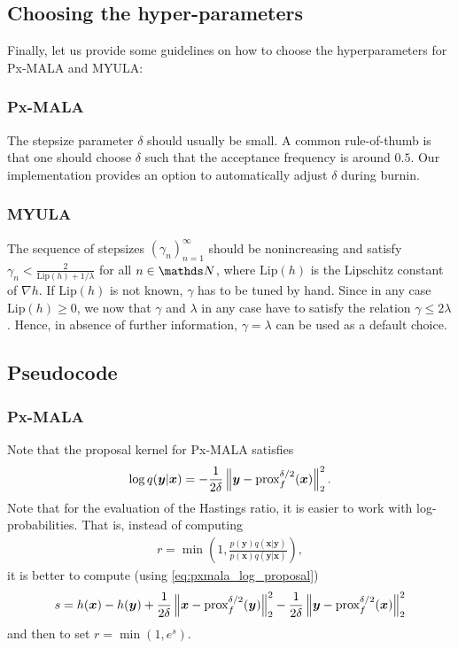 \documentclass[10pt]{article}
\numberwithin{equation}{section}
\begin{document}
\subsection{Choosing the hyper-parameters}

Finally, let us provide some guidelines on how to choose the hyperparameters for Px-MALA and MYULA:

\subsubsection*{Px-MALA}

The stepsize parameter $\delta$ should usually be small. A common rule-of-thumb is that one should choose $\delta$ such that the acceptance frequency is around $0.5$. Our implementation provides an option to automatically adjust $\delta$ during burnin.

\subsubsection*{MYULA}

The sequence of stepsizes $(\gamma_n)_{n=1}^\infty$ should be nonincreasing and satisfy $\gamma_n < \frac{2}{\mathrm{Lip}(h) + 1/\lambda}$ for all $n \in \N$, where $\mathrm{Lip}(h)$ is the Lipschitz constant of $\nabla h$. If $\mathrm{Lip}(h)$ is not known, $\gamma$ has to be tuned by hand. Since in any case $\mathrm{Lip}(h) \geq 0$, we now that $\gamma$ and $\lambda$ in any case have to satisfy the relation $\gamma \leq 2 \lambda$. Hence, in absence of further information, $\gamma = \lambda$ can be used as a default choice.

\subsection{Pseudocode}

\subsubsection*{Px-MALA}

Note that the proposal kernel for Px-MALA satisfies
\begin{align}
\log q(\bm y | \bm x) = - \frac{1}{2\delta}\left\|\bm y - \text{prox}_{f}^{\delta/2}(\bm x)\right\|_2^2. \label{eq:pxmala_log_proposal}
\end{align}
Note that for the evaluation of the Hastings ratio, it is easier to work with log-probabilities. That is, instead of computing
\begin{align*}
r = \min \left( 1, \frac{p(\bm y) q(\bm x | \bm y)}{p(\bm x) q(\bm y | \bm x)} \right),
\end{align*}
it is better to compute (using \eqref{eq:pxmala_log_proposal})
\begin{align*}
s = h(\bm x) - h(\bm y) + \frac{1}{2 \delta}\left\|\bm x - \text{prox}_{f}^{\delta/2}(\bm y)\right\|_2^2 - \frac{1}{2 \delta}\left\|\bm y - \text{prox}_{f}^{\delta/2}(\bm x)\right\|_2^2
\end{align*}
and then to set $r = \min(1, e^s)$.
\end{document}
